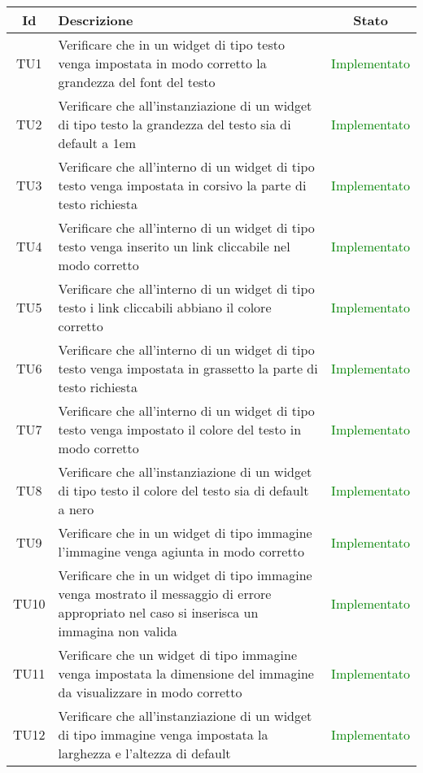 \begin{center}
	\begin{longtable}{|c|>{\centering}m{10cm}|c|}\hline
		Id & Descrizione & Stato\\ \hline
		TU1 & Verificare che in un widget di tipo testo venga impostata in modo corretto la grandezza del font del testo & \textcolor{Green}{Implementato}\\ \hline
		TU2 & Verificare che all'instanziazione di un widget di tipo testo la grandezza del testo sia di default a 1em & \textcolor{Green}{Implementato}\\ \hline
		TU3 & Verificare che all'interno di un widget di tipo testo venga impostata in corsivo la parte di testo richiesta & \textcolor{Green}{Implementato}\\ \hline
		TU4 & Verificare che all'interno di un widget di tipo testo venga inserito un link cliccabile nel modo corretto & \textcolor{Green}{Implementato}\\ \hline
		TU5 & Verificare che all'interno di un widget di tipo testo i link cliccabili abbiano il colore corretto & \textcolor{Green}{Implementato}\\ \hline
		TU6 & Verificare che all'interno di un widget di tipo testo venga impostata in grassetto la parte di testo richiesta & \textcolor{Green}{Implementato}\\ \hline
		TU7 & Verificare che all'interno di un widget di tipo testo venga impostato il colore del testo in modo corretto & \textcolor{Green}{Implementato}\\ \hline
		TU8 & Verificare che all'instanziazione di un widget di tipo testo il colore del testo sia di default a nero & \textcolor{Green}{Implementato}\\ \hline
		TU9 & Verificare che in un widget di tipo immagine l'immagine venga agiunta in modo corretto & \textcolor{Green}{Implementato}\\ \hline
		TU10 & Verificare che in un widget di tipo immagine venga mostrato il messaggio di errore appropriato nel caso si inserisca un immagina non valida & \textcolor{Green}{Implementato}\\ \hline
		TU11 & Verificare che un widget di tipo immagine venga impostata la dimensione del immagine da visualizzare in modo corretto & \textcolor{Green}{Implementato}\\ \hline
		TU12 & Verificare che all'instanziazione di un widget di tipo immagine venga impostata la larghezza e l'altezza di default & \textcolor{Green}{Implementato}\\ \hline

\end{longtable}
\end{center}
